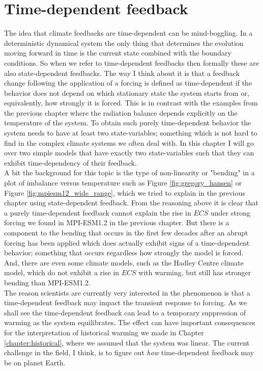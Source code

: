 \documentclass[12pt]{book}
\begin{document}
\chapter{Time-dependent feedback}
\label{chapter:time-dependent}
The idea that climate feedbacks are time-dependent can be mind-boggling. In a deterministic dynamical system the only thing that determines the evolution moving forward in time is the current state combined with the boundary conditions. 
So when we refer to time-dependent feedbacks then formally these are also state-dependent feedbacks. 
The way I think about it is that a feedback change following the application of a forcing is defined as time-dependent if the behavior does not depend on which stationary state the system starts from or, equivalently, how strongly it is forced. This is in contrast with the examples from the previous chapter where the radiation balance depends explicitly on the temperature of the system. 
To obtain such purely time-dependent behavior the system needs to have at least two state-variables; something which is not hard to find in the complex climate systems we often deal with. In this chapter I will go over two simple models that have exactly two state-variables such that they can exhibit time-dependency of their feedback. 
\\

A bit the background for this topic is the type of non-linearity or "bending" in a plot of imbalance versus temperature such as Figure \ref{fig:gregory_hansen} or Figure \ref{fig:mpiesm12_wide_range}, which we tried to explain in the previous chapter using state-dependent feedback. From the reasoning above it is clear that a purely time-dependent feedback cannot explain the rise in $ECS$ under strong forcing we found in MPI-ESM1.2 in the previous chapter. But there is a component to the bending that occurs in the first few decades after an abrupt forcing has been applied which does actually exhibit signs of a time-dependent behavior; something that occurs regardless how strongly the model is forced. And, there are even some climate models, such as the Hadley Centre climate model, which do not exhibit a rise in $ECS$ with warming, but still has stronger bending than MPI-ESM1.2. 
\\

The reason scientists are currently very interested in the phenomenon is that a time-dependent feedback may impact the transient response to forcing. As we shall see the time-dependent feedback can lead to a temporary suppression of warming as the system equilibrates. The effect can have important consequences for the interpretation of historical warming we made in Chapter \ref{chapter:historical}, where we assumed that the system was linear. The current challenge in the field, I think, is to figure out {\em how} time-dependent feedback may be on planet Earth.
\end{document}
